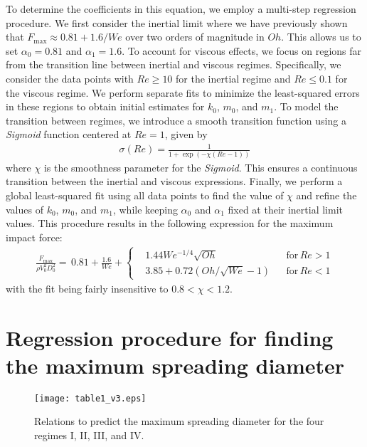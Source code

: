 \documentclass[reprint,amssymb,superscriptaddress,aps,prfluids,onecolumn]{revtex4-1}
\begin{document}
To determine the coefficients in this equation, we employ a multi-step regression procedure. We first consider the inertial limit where we have previously \cite{sanjayzhang2022prl,sanjay2024inertia} shown that $F_{\text{max}} \approx 0.81 + 1.6/We$ over two orders of magnitude in $Oh$. This allows us to set $\alpha_0 = 0.81$ and $\alpha_1 = 1.6$. To account for viscous effects, we focus on regions far from the transition line between inertial and viscous regimes. Specifically, we consider the data points with $Re \geq 10$ for the inertial regime and $Re \leq 0.1$ for the viscous regime. We perform separate fits to minimize the least-squared errors in these regions to obtain initial estimates for $k_0$, $m_0$, and $m_1$. To model the transition between regimes, we introduce a smooth transition function using a {\it Sigmoid} function centered at $Re = 1$, given by
\begin{align}
	\sigma(Re) = \frac{1}{1 + \exp(-\chi\left(Re - 1\right))}
\end{align}
where $\chi$ is the smoothness parameter for the {\it Sigmoid}. This ensures a continuous transition between the inertial and viscous expressions. Finally, we perform a global least-squared fit using all data points to find the value of $\chi$ and refine the values of $k_0$, $m_0$, and $m_1$, while keeping $\alpha_0$ and $\alpha_1$ fixed at their inertial limit values. This procedure results in the following expression for the maximum impact force:
\begin{align}
	\label{FinalFmaxWithCoeff}
	\frac{F_{\text{max}}}{\rho V_0^2D_0^2} =\, 0.81 + \frac{1.6}{We} + \left\{ \begin{aligned} 
		&1.44 We^{-1/4}\sqrt{Oh} && \text{for}\,Re > 1\\ 
		&3.85 + 0.72\left(Oh/\sqrt{We} - 1\right) && \text{for}\,Re < 1 
	\end{aligned} \right.
\end{align}
with the fit being fairly insensitive to $0.8 < \chi < 1.2$.
	
	
\section{Regression procedure for finding the maximum spreading diameter}
\begin{figure}
	\centering
	\texttt{[image: table1\_v3.eps]}
	\caption{Relations to predict the maximum spreading diameter for the four regimes I, II, III, and IV.  }
	\label{supp:dmax_results}
\end{figure}
\end{document}
